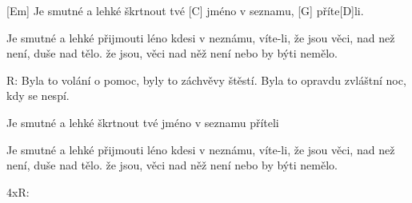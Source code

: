 
[Em] Je smutné a lehké
škrtnout tvé [C] jméno v seznamu,
[G] příte[D]li.

Je smutné a lehké
přijmouti léno kdesi v neznámu,
víte-li,
že jsou věci, nad než není,
duše nad tělo.
že jsou, věci nad něž není
nebo by býti nemělo.

R: Byla to volání o pomoc,
byly to záchvěvy štěstí.
Byla to opravdu zvláštní noc, 
kdy se nespí.

Je smutné a lehké
škrtnout tvé jméno v seznamu
příteli

Je smutné a lehké
přijmouti léno kdesi v neznámu,
víte-li,
že jsou věci, nad než není,
duše nad tělo.
že jsou, věci nad něž není
nebo by býti nemělo.

4xR: